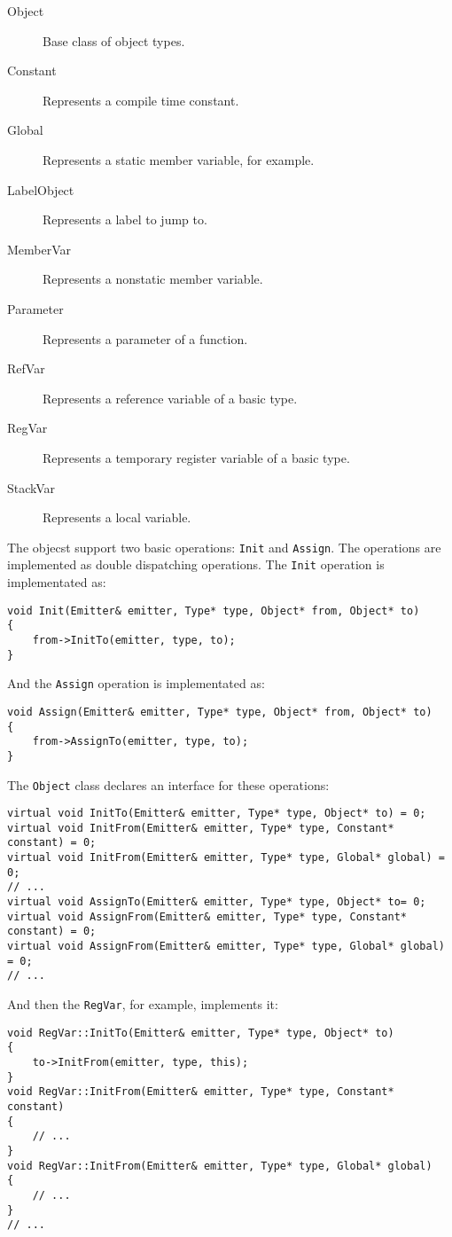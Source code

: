 \documentclass[a4paper,oneside,11pt]{book}
\theoremstyle{definition}
\begin{document}
\begin{description}
\item[Object]
Base class of object types.
\item[Constant]
Represents a compile time constant.
\item[Global]
Represents a static member variable, for example.
\item[LabelObject]
Represents a label to jump to.
\item[MemberVar]
Represents a nonstatic member variable.
\item[Parameter]
Represents a parameter of a function.
\item[RefVar]
Represents a reference variable of a basic type.
\item[RegVar]
Represents a temporary register variable of a basic type.
\item[StackVar]
Represents a local variable.
\end{description}
The objecst support two basic operations: \verb|Init| and \verb|Assign|.
The operations are implemented as double dispatching operations.
The \verb|Init| operation is implementated as:
\lstset{language=C++}
\begin{lstlisting}[frame=trBL]
void Init(Emitter& emitter, Type* type, Object* from, Object* to)
{
    from->InitTo(emitter, type, to);
}
\end{lstlisting}
And the \verb|Assign| operation is implementated as:
\lstset{language=C++}
\begin{lstlisting}[frame=trBL]
void Assign(Emitter& emitter, Type* type, Object* from, Object* to)
{
    from->AssignTo(emitter, type, to);
}
\end{lstlisting}
The \verb|Object| class declares an interface for these operations:
\lstset{language=C++}
\begin{lstlisting}[frame=trBL]
virtual void InitTo(Emitter& emitter, Type* type, Object* to) = 0;
virtual void InitFrom(Emitter& emitter, Type* type, Constant* constant) = 0;
virtual void InitFrom(Emitter& emitter, Type* type, Global* global) = 0;
// ...
virtual void AssignTo(Emitter& emitter, Type* type, Object* to= 0;
virtual void AssignFrom(Emitter& emitter, Type* type, Constant* constant) = 0;
virtual void AssignFrom(Emitter& emitter, Type* type, Global* global) = 0;
// ...
\end{lstlisting}
And then the \verb|RegVar|, for example, implements it:
\lstset{language=C++}
\begin{lstlisting}[frame=trBL]
void RegVar::InitTo(Emitter& emitter, Type* type, Object* to)
{
    to->InitFrom(emitter, type, this);
}
void RegVar::InitFrom(Emitter& emitter, Type* type, Constant* constant)
{
    // ...
}
void RegVar::InitFrom(Emitter& emitter, Type* type, Global* global)
{
    // ...
}
// ...
\end{lstlisting}
\end{document}

